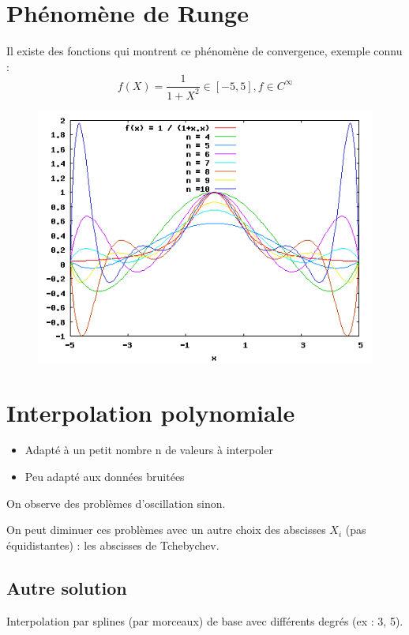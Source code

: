 \section {Phénomène de Runge}

Il existe des fonctions qui montrent ce phénomène de convergence, exemple connu :
\begin{equation}
f(X) = \frac{1}{1 + X^2} \in [-5,5], f \in C^{\infty}
\end{equation}

\begin{figure}[h]
    \centering
    \includegraphics[scale=0.6]{2-interp-runge.png}
\end{figure}


\section* {Interpolation polynomiale}

\begin{itemize}
\item Adapté à un petit nombre n de valeurs à interpoler
\item Peu adapté aux données bruitées
\end{itemize}

On observe des problèmes d'oscillation sinon.

On peut diminuer ces problèmes avec un autre choix des abscisses $X_i$ (pas équidistantes) : les abscisses de Tchebychev.


\subsection* {Autre solution}

Interpolation par splines (par morceaux) de base avec différents degrés (ex : 3, 5).



